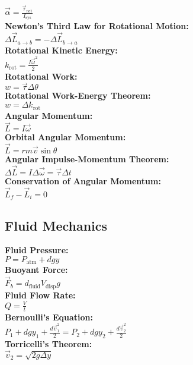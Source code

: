 \documentclass[12pt]{article}
\begin{document}
    \\ \( \vec{ \alpha } = \displaystyle\frac{ \vec{ \tau }_{\text{net}} }{ I_{\text{sys}} } \)
\\ \textbf{Newton's Third Law for Rotational Motion:}
    \\ \( \Delta \vec{ L }_{a \rightarrow{b}} = - \Delta \vec{ L }_{b \rightarrow{a}} \)
\\ \textbf{Rotational Kinetic Energy:}
    \\ \( k_{\text{rot}} = \displaystyle\frac{ I \vec{ \omega }^2 }{ 2 } \)
\\ \textbf{Rotational Work:}
    \\ \( w = \vec{ \tau } \Delta \theta \)
\\ \textbf{Rotational Work-Energy Theorem:}
    \\ \( w = \Delta k_{\text{rot}} \)
\\ \textbf{Angular Momentum:}
    \\ \( \vec{ L } = I \vec{ \omega } \)
\\ \textbf{Orbital Angular Momentum:}
    \\ \( \vec{ L } = rm \vec{ v } \sin \theta \)
\\ \textbf{Angular Impulse-Momentum Theorem:}
    \\ \( \Delta \vec{ L } = I \Delta \vec{ \omega } = \vec{ \tau } \Delta t \)
\\ \textbf{Conservation of Angular Momentum:}
    \\ \( \vec{ L }_f - \vec{ L }_i = 0 \)

\subsection*{Fluid Mechanics}
\textbf{Fluid Pressure:}
    \\ \( P = P_{\text{atm}} + dgy \)
\\ \textbf{Buoyant Force:}
    \\ \( \vec{ F }_b = d_{\text{fluid}} V_{\text{disp}} g \)
\\ \textbf{Fluid Flow Rate:}
    \\ \( Q = \displaystyle\frac{ V }{ t } \)
\\ \textbf{Bernoulli's Equation: }
    \\ \( P_1 + dgy_1 + \displaystyle\frac{ d \vec{ v }_1^2 }{ 2 } = P_2 + dgy_2 + \displaystyle\frac{ d \vec{ v }_2^2 }{ 2 } \)
\\ \textbf{Torricelli's Theorem:}
    \\ \( \vec{ v }_2 = \sqrt{ 2g \Delta y } \)
\end{document}
